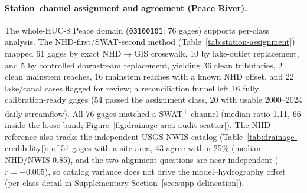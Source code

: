 \paragraph{Station--channel assignment and agreement (Peace River).}
The whole-HUC-8 Peace domain (\texttt{03100101}; 76 gages) supports per-class analysis. The NHD-first/SWAT-second method (Table~\ref{tab:station-assignment}) mapped 61 gages by exact NHD$\rightarrow$GIS crosswalk, 10 by lake-outlet replacement, and 5 by controlled downstream replacement, yielding 36 clean tributaries, 2 clean mainstem reaches, 16 mainstem reaches with a known NHD offset, and 22 lake/canal cases flagged for review; a reconciliation funnel left 16 fully calibration-ready gages (54 passed the assignment class, 20 with usable 2000--2024 daily streamflow). All 76 gages matched a SWAT\textsuperscript{+} channel (median ratio 1.11, 66 inside the loose band; Figure~\ref{fig:drainage-area-audit-scatter}). The NHD reference also tracks the independent USGS NWIS catalog (Table~\ref{tab:drainage-credibility}): of 57 gages with a site area, 43 agree within 25\% (median NHD/NWIS 0.85), and the two alignment questions are near-independent ($r=-0.005$), so catalog variance does not drive the model--hydrography offset (per-class detail in Supplementary Section~\ref{sec:supp-delineation}).

\begin{table}[htbp]
  \centering
  \caption{NHD-first/SWAT-second USGS station-to-channel assignment for the Peace River HUC-8 domain (Objective~2).}
  \label{tab:station-assignment}
  \small
  \setlength{\tabcolsep}{6pt}
  \renewcommand{\arraystretch}{1.05}
\end{table}

\begin{table}[htbp]
  \centering
  \caption{Peace River two-way drainage-area alignment: NHD reference versus USGS NWIS site area, and joint NHD--USGS / SWAT\textsuperscript{+}--NHD agreement (Objective~2). The two comparisons are near-independent ($r=-0.005$).}
  \label{tab:drainage-credibility}
  \small
  \setlength{\tabcolsep}{6pt}
  \renewcommand{\arraystretch}{1.05}
\end{table}

\begin{table}[htbp]
  \centering
  \caption{Peace River mainstem drainage-area pipeline trace on a diagnostic panel of representative mainstem reaches: median SWAT\textsuperscript{+}/NHD ratio by stage, localizing the systematic offset (Objective~2). Stage labels defined in Section~\ref{sec:methods-drainage-audit}.}
  \label{tab:drainage-area-pipeline-trace}
  \footnotesize
  \setlength{\tabcolsep}{4pt}
  \renewcommand{\arraystretch}{1.1}
  \resizebox{\textwidth}{!}{%
  }
\end{table}

